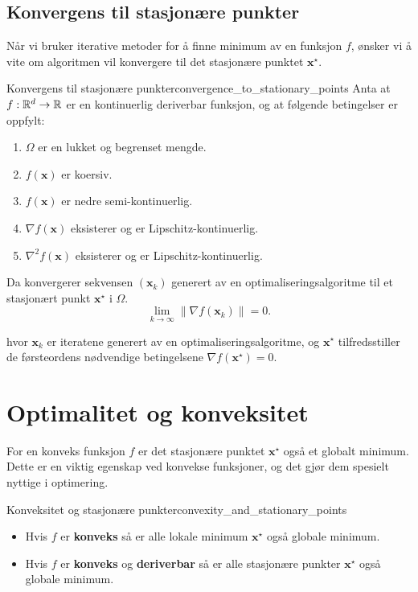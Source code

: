 \subsection{Konvergens til stasjonære punkter}
Når vi bruker iterative metoder for å finne minimum av en funksjon \(f\), ønsker vi å vite om algoritmen vil konvergere til det stasjonære punktet \(\symbf{x}^\star\).

\begin{theorem}{Konvergens til stasjonære punkter}{convergence_to_stationary_points}
	Anta at \(f: \mathbb{R}^d \to \mathbb{R}\) er en kontinuerlig deriverbar funksjon, og at følgende betingelser er oppfylt:
	\begin{enumerate}
		\item \(\Omega\) er en lukket og begrenset mengde.
		\item \(f(\symbf{x})\) er koersiv.
		\item \(f(\symbf{x})\) er nedre semi-kontinuerlig.
		\item \(\nabla f(\symbf{x})\) eksisterer og er Lipschitz-kontinuerlig.
		\item \(\nabla^2 f(\symbf{x})\) eksisterer og er Lipschitz-kontinuerlig.
	\end{enumerate}
	Da konvergerer sekvensen \((\symbf{x}_k)\) generert av en optimaliseringsalgoritme til et stasjonært punkt \(\symbf{x}^\star\) i \(\Omega\).
	\[
		\lim_{k \to \infty} \|\nabla f(\symbf{x}_k)\| = 0.
	\]

	hvor \(\symbf{x}_k\) er iteratene generert av en optimaliseringsalgoritme, og \(\symbf{x}^\star\) tilfredsstiller de førsteordens nødvendige betingelsene \(\nabla f(\symbf{x}^\star) = 0\).

\end{theorem}

\section{Optimalitet og konveksitet}
\label{sec:optimality_and_convexity}
For en konveks funksjon \(f\) er det stasjonære punktet \(\mathbf{x}^\star\) også et globalt minimum. Dette er en viktig egenskap ved konvekse funksjoner, og det gjør dem spesielt nyttige i optimering.

\begin{remark}{Konveksitet og stasjonære punkter}{convexity_and_stationary_points}
	\begin{itemize}
		\item Hvis \(f\) er \textbf{konveks} så er alle lokale minimum \(\mathbf{x}^\star\) også globale minimum.
		\item Hvis \(f\) er \textbf{konveks} og \textbf{deriverbar} så er alle stasjonære punkter \(\mathbf{x}^\star\) også globale minimum.
	\end{itemize}
\end{remark}


